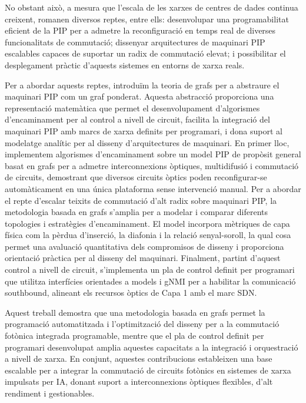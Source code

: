 No obstant això, a mesura que l'escala de les xarxes de centres de dades continua creixent, romanen diversos reptes, entre ells: desenvolupar una programabilitat eficient de la PIP per a admetre la reconfiguració en temps real de diverses funcionalitats de commutació;
dissenyar arquitectures de maquinari PIP escalables capaces de suportar un radix de commutació elevat;
i possibilitar el desplegament pràctic d'aquests sistemes en entorns de xarxa reals.

Per a abordar aquests reptes, introduïm la teoria de grafs per a abstraure el maquinari PIP com un graf ponderat.
Aquesta abstracció proporciona una representació matemàtica que permet el desenvolupament d'algorismes d'encaminament per al control a nivell de circuit, facilita la integració del maquinari PIP amb marcs de xarxa definits per programari, i dona suport al modelatge analític per al disseny d'arquitectures de maquinari.
En primer lloc, implementem algorismes d'encaminament sobre un model PIP de propòsit general basat en grafs per a admetre interconnexions òptiques, multidifusió i commutació de circuits, demostrant que diversos circuits òptics poden reconfigurar-se automàticament en una única plataforma sense intervenció manual.
Per a abordar el repte d'escalar teixits de commutació d'alt radix sobre maquinari PIP, la metodologia basada en grafs s'amplia per a modelar i comparar diferents topologies i estratègies d'encaminament.
El model incorpora mètriques de capa física com la pèrdua d'inserció, la diafonia i la relació senyal-soroll, la qual cosa permet una avaluació quantitativa dels compromisos de disseny i proporciona orientació pràctica per al disseny del maquinari.
Finalment, partint d'aquest control a nivell de circuit, s'implementa un pla de control definit per programari que utilitza interfícies orientades a models i gNMI per a habilitar la comunicació southbound, alineant els recursos òptics de Capa 1 amb el marc SDN.

Aquest treball demostra que una metodologia basada en grafs permet la programació automatitzada i l'optimització del disseny per a la commutació fotònica integrada programable, mentre que el pla de control definit per programari desenvolupat amplia aquestes capacitats a la integració i orquestració a nivell de xarxa.
En conjunt, aquestes contribucions estableixen una base escalable per a integrar la commutació de circuits fotònics en sistemes de xarxa impulsats per IA, donant suport a interconnexions òptiques flexibles, d'alt rendiment i gestionables.
